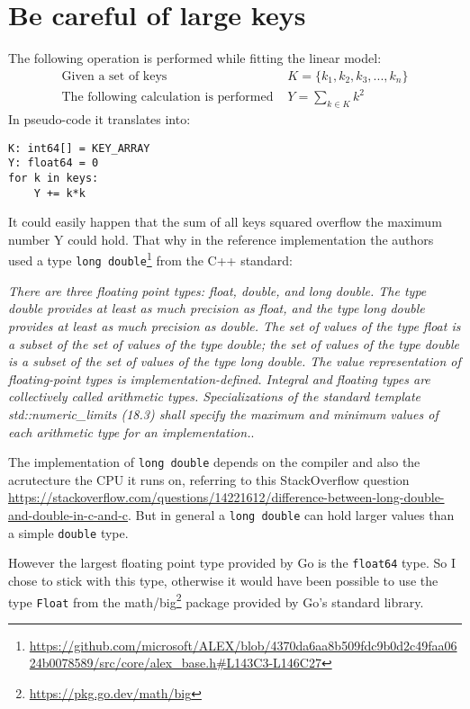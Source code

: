 \section{Be careful of large keys}
The following operation is performed while fitting the linear model:
\begin{align*}
\text{Given a set of keys } & K = \{k_1, k_2, k_3, ..., k_n \}\\
\text{The following calculation is performed } & Y = \sum_{k \in K}k^2
\end{align*}
In pseudo-code it translates into:
\begin{lstlisting}
K: int64[] = KEY_ARRAY
Y: float64 = 0
for k in keys:
    Y += k*k
\end{lstlisting}
It could easily happen that the sum of all keys squared overflow the maximum number Y could hold. That why in the reference implementation the authors used a type \texttt{long double}\footnote{\url{https://github.com/microsoft/ALEX/blob/4370da6aa8b509fdc9b0d2c49faa0624b0078589/src/core/alex_base.h\#L143C3-L146C27}} from the C++ standard:

\textit{There are three floating point types: float, double, and long double. The type double provides at least as much precision as float, and the type long double provides at least as much precision as double. The set of values of the type float is a subset of the set of values of the type double; the set of values of the type double is a subset of the set of values of the type long double. The value representation of floating-point types is implementation-defined. Integral and floating types are collectively called arithmetic types. Specializations of the standard template std::numeric\_limits (18.3) shall specify the maximum and minimum values of each arithmetic type for an implementation.}.

The implementation of \texttt{long double} depends on the compiler and also the acrutecture the CPU it runs on, referring to this StackOverflow question \url{https://stackoverflow.com/questions/14221612/difference-between-long-double-and-double-in-c-and-c}. But in general a \texttt{long double} can hold larger values than a simple \texttt{double} type.

However the largest floating point type provided by Go is the \texttt{float64} type. So I chose to stick with this type, otherwise it would have been possible to use the type \texttt{Float} from the math/big\footnote{\url{https://pkg.go.dev/math/big}} package provided by Go's standard library.


